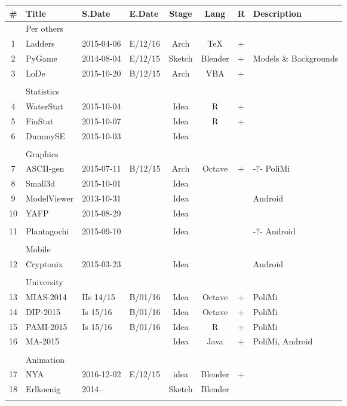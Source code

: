 \documentclass[a4paper,12pt]{article} %
\begin{document}
	
\begin{tabularx}{\textwidth}{|c|l|l|l|c|c|c|X|}
	\hline
	\# & Title & S.Date & E.Date & Stage & Lang & R & Description \\
	\hline
	& Per others &  &  &  &  &  &  \\
	\hline
	1 & Ladders & 2015-04-06 & E/12/16 & Arch & \TeX & + &  \\
	\hline
	2 & PyGame & 2014-08-04 & E/12/15 & Sketch & Blender & + & Models \& Backgrounds \\
	\hline
	3 & LoDe & 2015-10-20 & B/12/15 & Arch & VBA & + &  \\
	\hline
	&  &  &  &  &  &  &  \\
	\hline
	& Statistics &  &  &  &  &  &  \\
	\hline
	4 & WaterStat & 2015-10-04 &  & Idea & R & + &  \\
	\hline
	5 & FinStat & 2015-10-07 &  & Idea & R & + &  \\
	\hline
	6 & DummySE & 2015-10-03 &  & Idea &  &  &  \\
	\hline
	&  &  &  &  &  &  &  \\
	\hline
	& Graphics &  &  &  &  &  &  \\
	\hline
	7 & ASCII-gen & 2015-07-11 & B/12/15 & Arch & Octave & + & -?- PoliMi \\
	\hline
	8 & Small3d & 2015-10-01 &  & Idea &  &  &  \\
	\hline
	9 & ModelViewer & 2013-10-31 &  & Idea &  &  & Android \\
	\hline
	10 & YAFP & 2015-08-29 &  & Idea &  &  &  \\
	\hline
	&  &  &  &  &  &  &  \\
	\hline
	11 & Plantagochi & 2015-09-10 &  & Idea &  &  & -?- Android \\
	\hline
	&  &  &  &  &  &  &  \\
	\hline
	& Mobile &  &  &  &  &  &  \\
	\hline
	12 & Cryptonix & 2015-03-23 &  & Idea &  &  & Android \\
	\hline
	&  &  &  &  &  &  &  \\
	\hline
	& University &  &  &  &  &  &  \\
	\hline
	13 & MIAS-2014 & IIs 14/15 & B/01/16 & Idea & Octave & + & PoliMi \\
	\hline
	14 & DIP-2015 & Is 15/16 & B/01/16 & Idea & Octave & + & PoliMi \\
	\hline
	15 & PAMI-2015 & Is 15/16 & B/01/16 & Idea & R & + & PoliMi \\
	\hline
	16 & MA-2015 &  &  & Idea & Java & + & PoliMi, Android \\
	\hline
	&  &  &  &  &  &  &  \\
	\hline
	& Animation &  &  &  &  &  &  \\
	\hline
	17 & NYA & 2016-12-02 & E/12/15 & idea & Blender & + &  \\
	\hline
	18 & Erlkoenig & 2014-- &  & Sketch & Blender &  &  \\
	\hline
	&  &  &  &  &  &  &  \\
	\hline
\end{tabularx}

\end{document}

